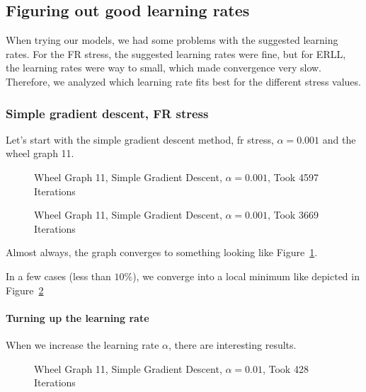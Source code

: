 \documentclass[12pt]{article}
\begin{document}
\subsection{Figuring out good learning rates}
When trying our models, we had some problems with the suggested learning rates. For the FR stress, the suggested learning rates were fine,
but for ERLL, the learning rates were way to small, which made convergence very slow. Therefore, we analyzed which learning rate fits best for the
different stress values.

\subsubsection{Simple gradient descent, FR stress}
Let's start with the simple gradient descent method, fr stress, $\alpha=0.001$ and the wheel graph 11.

\begin{figure}[H]
\centering

\caption{\label{wheel-graph-good} Wheel Graph 11, Simple Gradient Descent, $\alpha=0.001$, Took 4597 Iterations}
\end{figure}

\begin{figure}[H]
\centering

\caption{\label{wheel-graph-bad} Wheel Graph 11, Simple Gradient Descent, $\alpha=0.001$, Took 3669 Iterations}
\end{figure}

Almost always, the graph converges to something looking like Figure~\ref{wheel-graph-good}.

In a few cases (less than $10\%$), we converge into a local minimum like depicted in Figure~\ref{wheel-graph-bad}

\paragraph{Turning up the learning rate}

When we increase the learning rate $\alpha$, there are interesting results.

\begin{figure}[H]
\centering 

\caption{\label{wheel-graph-alpha-0.01} Wheel Graph 11, Simple Gradient Descent, $\alpha=0.01$, Took 428 Iterations}
\end{figure}
\end{document}
